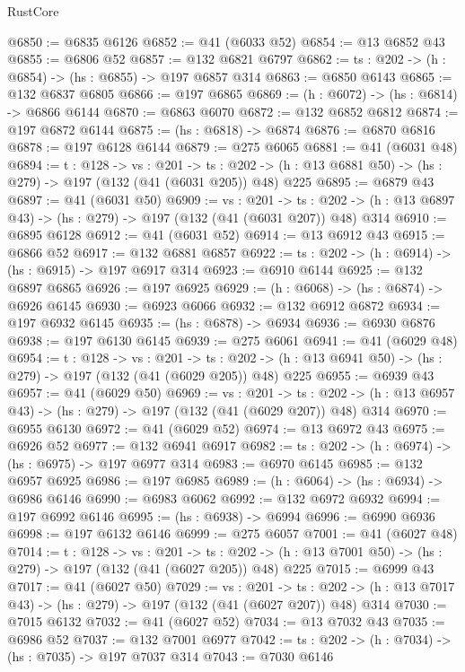 \begin{lexlean}{RustCore}
\begin{coremodule}
@6850 := @6835 @6126
@6852 := @41 (@6033 @52)
@6854 := @13 @6852 @43
@6855 := @6806 @52
@6857 := @132 @6821 @6797
@6862 := {ts : @202} -> (h : @6854) -> (hs : @6855) -> @197 @6857 @314
@6863 := @6850 @6143
@6865 := @132 @6837 @6805
@6866 := @197 @6865
@6869 := (h : @6072) -> (hs : @6814) -> @6866 @6144
@6870 := @6863 @6070
@6872 := @132 @6852 @6812
@6874 := @197 @6872 @6144
@6875 := (hs : @6818) -> @6874
@6876 := @6870 @6816
@6878 := @197 @6128 @6144
@6879 := @275 @6065
@6881 := @41 (@6031 @48)
@6894 := {t : @128} ->
  {vs : @201} ->
  {ts : @202} -> (h : @13 @6881 @50) -> (hs : @279) -> @197 (@132 (@41 (@6031 @205)) @48) @225
@6895 := @6879 @43
@6897 := @41 (@6031 @50)
@6909 := {vs : @201} ->
  {ts : @202} -> (h : @13 @6897 @43) -> (hs : @279) -> @197 (@132 (@41 (@6031 @207)) @48) @314
@6910 := @6895 @6128
@6912 := @41 (@6031 @52)
@6914 := @13 @6912 @43
@6915 := @6866 @52
@6917 := @132 @6881 @6857
@6922 := {ts : @202} -> (h : @6914) -> (hs : @6915) -> @197 @6917 @314
@6923 := @6910 @6144
@6925 := @132 @6897 @6865
@6926 := @197 @6925
@6929 := (h : @6068) -> (hs : @6874) -> @6926 @6145
@6930 := @6923 @6066
@6932 := @132 @6912 @6872
@6934 := @197 @6932 @6145
@6935 := (hs : @6878) -> @6934
@6936 := @6930 @6876
@6938 := @197 @6130 @6145
@6939 := @275 @6061
@6941 := @41 (@6029 @48)
@6954 := {t : @128} ->
  {vs : @201} ->
  {ts : @202} -> (h : @13 @6941 @50) -> (hs : @279) -> @197 (@132 (@41 (@6029 @205)) @48) @225
@6955 := @6939 @43
@6957 := @41 (@6029 @50)
@6969 := {vs : @201} ->
  {ts : @202} -> (h : @13 @6957 @43) -> (hs : @279) -> @197 (@132 (@41 (@6029 @207)) @48) @314
@6970 := @6955 @6130
@6972 := @41 (@6029 @52)
@6974 := @13 @6972 @43
@6975 := @6926 @52
@6977 := @132 @6941 @6917
@6982 := {ts : @202} -> (h : @6974) -> (hs : @6975) -> @197 @6977 @314
@6983 := @6970 @6145
@6985 := @132 @6957 @6925
@6986 := @197 @6985
@6989 := (h : @6064) -> (hs : @6934) -> @6986 @6146
@6990 := @6983 @6062
@6992 := @132 @6972 @6932
@6994 := @197 @6992 @6146
@6995 := (hs : @6938) -> @6994
@6996 := @6990 @6936
@6998 := @197 @6132 @6146
@6999 := @275 @6057
@7001 := @41 (@6027 @48)
@7014 := {t : @128} ->
  {vs : @201} ->
  {ts : @202} -> (h : @13 @7001 @50) -> (hs : @279) -> @197 (@132 (@41 (@6027 @205)) @48) @225
@7015 := @6999 @43
@7017 := @41 (@6027 @50)
@7029 := {vs : @201} ->
  {ts : @202} -> (h : @13 @7017 @43) -> (hs : @279) -> @197 (@132 (@41 (@6027 @207)) @48) @314
@7030 := @7015 @6132
@7032 := @41 (@6027 @52)
@7034 := @13 @7032 @43
@7035 := @6986 @52
@7037 := @132 @7001 @6977
@7042 := {ts : @202} -> (h : @7034) -> (hs : @7035) -> @197 @7037 @314
@7043 := @7030 @6146

\end{coremodule}
\end{lexlean}
